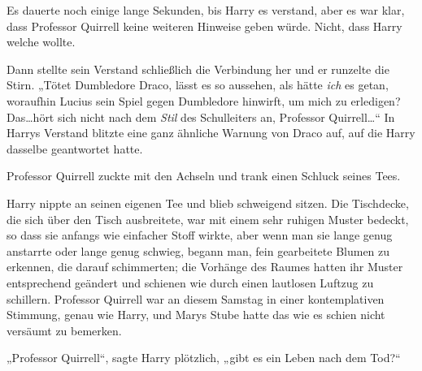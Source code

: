 Es dauerte noch einige lange Sekunden, bis Harry es verstand, aber es war klar, dass Professor Quirrell keine weiteren Hinweise geben würde. Nicht, dass Harry welche wollte.

Dann stellte sein Verstand schließlich die Verbindung her und er runzelte die Stirn.
„Tötet Dumbledore Draco, lässt es so aussehen, als hätte \emph{ich} es getan, woraufhin Lucius sein Spiel gegen Dumbledore hinwirft, um mich zu erledigen? Das…hört sich nicht nach dem \emph{Stil} des Schulleiters an, Professor Quirrell…“ In Harrys Verstand blitzte eine ganz ähnliche Warnung von Draco auf, auf die Harry dasselbe geantwortet hatte.

Professor Quirrell zuckte mit den Achseln und trank einen Schluck seines Tees.

Harry nippte an seinen eigenen Tee und blieb schweigend sitzen. Die Tischdecke, die sich über den Tisch ausbreitete, war mit einem sehr ruhigen Muster bedeckt, so dass sie anfangs wie einfacher Stoff wirkte, aber wenn man sie lange genug anstarrte oder lange genug schwieg, begann man, fein gearbeitete Blumen zu erkennen, die darauf schimmerten; die Vorhänge des Raumes hatten ihr Muster entsprechend geändert und schienen wie durch einen lautlosen Luftzug zu schillern. Professor Quirrell war an diesem Samstag in einer kontemplativen Stimmung, genau wie Harry, und Marys Stube hatte das wie es schien nicht versäumt zu bemerken.

„Professor Quirrell“, sagte Harry plötzlich, „gibt es ein Leben nach dem Tod?“

